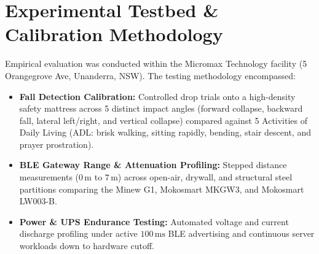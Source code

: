 \section{Experimental Testbed \& Calibration Methodology}
Empirical evaluation was conducted within the Micromax Technology facility (5 Orangegrove Ave, Unanderra, NSW). The testing methodology encompassed:
\begin{itemize}
    \item \textbf{Fall Detection Calibration:} Controlled drop trials onto a high-density safety mattress across 5 distinct impact angles (forward collapse, backward fall, lateral left/right, and vertical collapse) compared against 5 Activities of Daily Living (ADL: brisk walking, sitting rapidly, bending, stair descent, and prayer prostration).
    \item \textbf{BLE Gateway Range \& Attenuation Profiling:} Stepped distance measurements ($0\,\text{m}$ to $7\,\text{m}$) across open-air, drywall, and structural steel partitions comparing the Minew G1, Mokosmart MKGW3, and Mokosmart LW003-B.
    \item \textbf{Power \& UPS Endurance Testing:} Automated voltage and current discharge profiling under active $100\,\text{ms}$ BLE advertising and continuous server workloads down to hardware cutoff.
\end{itemize}
